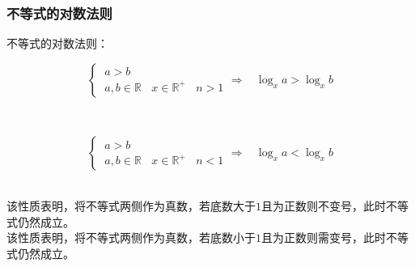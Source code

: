 \documentclass[UTF8]{ctexart}
\begin{document}
\subsubsection{不等式的对数法则}
    不等式的对数法则：
    \begin{large}
        \begin{equation*}
            \begin{cases}
                ~a>b\\[3mm]
                ~a,b\in\mathbb{R}~~~~x\in\mathbb{R^+}~~~~n>1
            \end{cases}
            \Rightarrow~~~~\log_{x}a>\log_{x}b
        \end{equation*}
    \end{large}\\
    \begin{large}
        \begin{equation*}
            \begin{cases}
                ~a>b\\[3mm]
                ~a,b\in\mathbb{R}~~~~x\in\mathbb{R^+}~~~~n<1
            \end{cases}
            \Rightarrow~~~~\log_{x}a<\log_{x}b
        \end{equation*}
    \end{large}\\[1mm]
    该性质表明，将不等式两侧作为真数，若底数大于$1$且为正数则不变号，此时不等式仍然成立。\\[3mm]
    该性质表明，将不等式两侧作为真数，若底数小于$1$且为正数则需变号，此时不等式仍然成立。

\newpage
\end{document}
